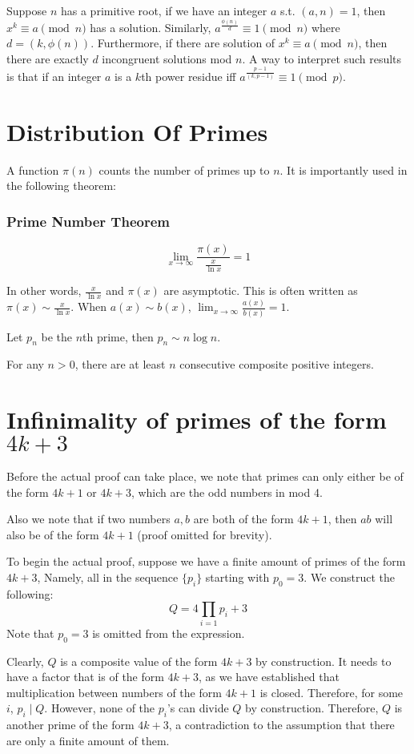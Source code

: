 \documentclass{article}
\begin{document}
\begin{multicols*}{2}
Suppose $n$ has a primitive root, if we have an integer $a$ s.t. $(a,n) = 1$, then $x^k \equiv a \pmod{n}$ has a solution. Similarly, $a^{\frac{\phi(n)}{d}} \equiv 1 \pmod{n}$ where $d = (k, \phi(n))$. Furthermore, if there are solution of $x^k \equiv a \pmod{n}$, then there are exactly $d$ incongruent solutions mod $n$. A way to interpret such results is that if an integer $a$ is a $k$th power residue iff $a^{\frac{p-1}{(k, p-1)}} \equiv 1 \pmod{p}$.

\section{Distribution Of Primes}

A function $\pi(n)$ counts the number of primes up to $n$. It is importantly used in the following theorem:

\subsubsection*{Prime Number Theorem}

\[\lim_{x \rightarrow \infty} \frac{\pi(x)}{\frac{x}{\ln{x}}} = 1\]

In other words, $\frac{x}{\ln{x}}$ and $\pi(x)$ are asymptotic. This is often written as $\pi(x) \sim \frac{x}{\ln{x}}$. When $a(x) \sim b(x)$, $\lim_{x \rightarrow \infty}\frac{a(x)}{b(x)} = 1$.

Let $p_n$ be the $n$th prime, then $p_n \sim n\log{n}$.

For any $n > 0$, there are at least $n$ consecutive composite positive integers.

\newpage

\section{Infinimality of primes of the form $4k+3$}

Before the actual proof can take place, we note that primes can only either be of the form $4k+1$ or $4k+3$, which are the odd numbers in mod 4.

Also we note that if two numbers $a, b$ are both of the form $4k +1$, then $ab$ will also be of the form $4k + 1$ (proof omitted for brevity).

To begin the actual proof, suppose we have a finite amount of primes of the form $4k+3$, Namely, all in the sequence $\{p_i\}$ starting with $p_0 = 3$. We construct the following: \[Q = 4\prod_{i=1}{p_i} + 3\]Note that $p_0 = 3$ is omitted from the expression.

Clearly, $Q$ is a composite value of the form $4k+3$ by construction. It needs to have a factor that is of the form $4k+3$, as we have established that multiplication between numbers of the form $4k+1$ is closed. Therefore, for some $i$, $p_i \mid Q$. However, none of the $p_i$'s can divide $Q$ by construction. Therefore, $Q$ is another prime of the form $4k+3$, a contradiction to the assumption that there are only a finite amount of them.

\end{multicols*}
\end{document}
